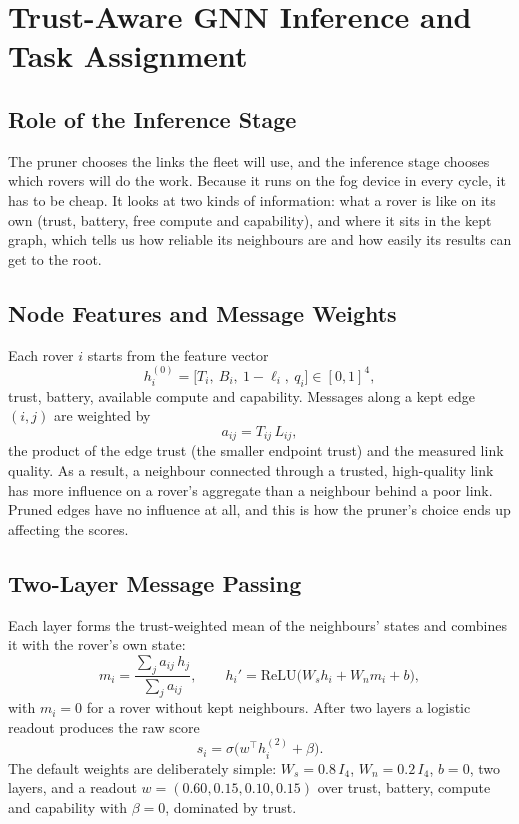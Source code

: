 \chapter{Trust-Aware GNN Inference and Task Assignment}
\label{ch:gnn}

\section{Role of the Inference Stage}

The pruner chooses the links the fleet will use, and the inference stage
chooses which rovers will do the work. Because it runs on the fog device in
every cycle, it has to be cheap. It looks at two kinds of information: what a
rover is like on its own (trust, battery, free compute and capability), and
where it sits in the kept graph, which tells us how reliable its neighbours
are and how easily its results can get to the root.

\section{Node Features and Message Weights}

Each rover $i$ starts from the feature vector
\begin{equation}
h_i^{(0)}=\bigl[T_i,\ B_i,\ 1-\ell_i,\ q_i\bigr]\in[0,1]^4,
\end{equation}
trust, battery, available compute and capability. Messages along a kept edge
$(i,j)$ are weighted by
\begin{equation}
a_{ij}=T_{ij}\,L_{ij},
\end{equation}
the product of the edge trust (the smaller endpoint trust) and the measured
link quality. As a result, a neighbour connected through a trusted,
high-quality link has more influence on a rover's aggregate than a neighbour
behind a poor link. Pruned edges have no influence at all, and this is how the
pruner's choice ends up affecting the scores.

\section{Two-Layer Message Passing}

Each layer forms the trust-weighted mean of the neighbours' states and
combines it with the rover's own state:
\begin{equation}
m_i=\frac{\sum_{j}a_{ij}\,h_j}{\sum_j a_{ij}},\qquad
h_i'=\mathrm{ReLU}\bigl(W_sh_i+W_nm_i+b\bigr),
\label{eq:gnn:layer}
\end{equation}
with $m_i=0$ for a rover without kept neighbours. After two layers a
logistic readout produces the raw score
\begin{equation}
s_i=\sigma\bigl(w^{\top}h_i^{(2)}+\beta\bigr).
\label{eq:gnn:readout}
\end{equation}
The default weights are deliberately simple: $W_s=0.8\,I_4$,
$W_n=0.2\,I_4$, $b=0$, two layers, and a readout $w=(0.60,0.15,0.10,0.15)$
over trust, battery, compute and capability with $\beta=0$, dominated by
trust.



